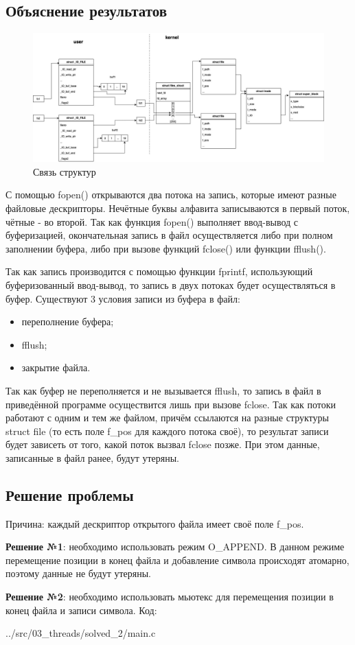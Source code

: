 \subsection*{Объяснение результатов}
\begin{figure}[H]
	\centering
	\includegraphics[scale=0.37]{img/os_lab_05-3.jpg}
	\caption{Связь структур}
	\label{fig:1}
\end{figure}
С помощью fopen() открываются два потока на запись, которые имеют разные файловые дескрипторы. Нечётные буквы алфавита записываются в первый поток, чётные - во второй. Так как функция fopen() выполняет ввод-вывод с буферизацией, окончательная запись в файл осуществляется либо при полном заполнении буфера, либо при вызове функций fclose() или функции fflush().

Так как запись производится с помощью функции fprintf, использующий буферизованный ввод-вывод, то запись в двух потоках будет осуществляться в буфер. Существуют 3 условия записи из буфера в файл:
\begin{itemize}
	\item переполнение буфера;
	\item fflush;
	\item закрытие файла.
\end{itemize}

Так как буфер не переполняется и не вызывается fflush, то запись в файл в приведённой программе осуществится лишь при вызове fclose. Так как потоки работают с одним и тем же файлом, причём ссылаются на разные структуры struct file (то есть поле f\_pos для каждого потока своё), то результат записи будет зависеть от того, какой поток вызвал fclose позже. При этом данные, записанные в файл ранее, будут утеряны.

\subsection*{Решение проблемы}
Причина: каждый дескриптор открытого файла имеет своё поле f\_pos. 

\textbf{Решение №1}: необходимо использовать режим O\_APPEND. В данном режиме перемещение позиции в конец файла и добавление символа происходят атомарно, поэтому данные не будут утеряны. 

\textbf{Решение №2}: необходимо использовать мьютекс для перемещения позиции в конец файла и записи символа. Код:
\begin{lstinputlisting}[label=third,caption=Решение с мьютексом, language=c, firstline=1, lastline=41]{../src/03_threads/solved_2/main.c}
\end{lstinputlisting}